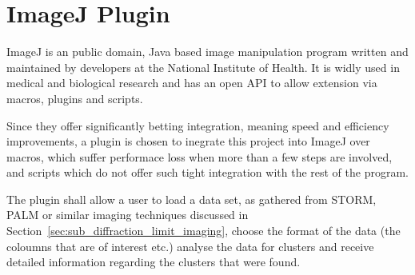 
\part{ImageJ Plugin}
\label{part:imagej_plugin}

ImageJ is an public domain, Java based image manipulation program written and
maintained by developers at the National Institute of Health. It is widly used
in medical and biological research and has an open API to allow extension via
macros, plugins and scripts.

Since they offer significantly betting integration, meaning speed and
efficiency improvements, a plugin is chosen to inegrate this project into
ImageJ over macros, which suffer performace loss when more than a few steps are
involved, and scripts which do not offer such tight integration with the rest
of the program.

The plugin shall allow a user to load a data set, as gathered from STORM, PALM
or similar imaging techniques discussed in
Section~\ref{sec:sub_diffraction_limit_imaging}, choose the format of the data
(the coloumns that are of interest etc.) analyse the data for clusters and
receive detailed information regarding the clusters that were found.


